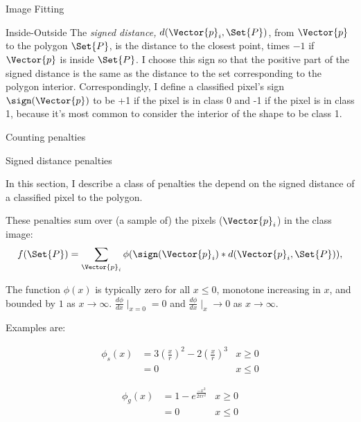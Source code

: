 \begin{plSection}{Image Fitting}
\begin{plSection}{Inside-Outside}
The {\em signed distance,} $d(\Vector{p}_i,\Set{P})$, from $\Vector{p}$ to the polygon $\Set{P}$,
is the distance to the closest point, times $-1$ if $\Vector{p}$ is inside $\Set{P}$.
I choose this sign so that the positive part of the signed distance
is the same as the distance to the set corresponding to the polygon interior.
Correspondingly, I define a classified pixel's sign $\sign(\Vector{p})$ to be +1
if the pixel is in class 0 and -1 if the pixel is in class 1,
because it's most common to consider the interior of the shape
to be class 1.

\end{plSection}%
\begin{plSection}{Counting penalties}
\label{sec:counting-penalties}

\end{plSection}%
\begin{plSection}{Signed distance penalties}
\label{sec:signed-distance-penalties}

In this section, I describe a class of penalties the depend on the
signed distance of a classified pixel to the polygon.

These penalties sum over (a sample of) the pixels ($\Vector{p}_i$) in the class image:
\begin{equation}
f(\Set{P}) = \sum_{\Vector{p}_i} \phi( \sign(\Vector{p}_i) \ast d(\Vector{p}_i,\Set{P}) ) ,
\end{equation}

The function $\phi(x)$ is typically zero for all $x \le 0$,
monotone increasing in $x$, and bounded by $1$ as $x\rightarrow\infty$.
$\frac{d\phi}{dx}\mid_{x=0} = 0$ and $\frac{d\phi}{dx}\mid_{x} \rightarrow 0$
as $x\rightarrow\infty$.

Examples are:

\begin{eqnarray}
\phi_s(x) & = 3 \left(\frac{x}{r}\right)^2 - 2 \left(\frac{x}{r}\right)^3 & {x \geq 0} \\
          & = 0 & {x \leq 0}
\end{eqnarray}

\begin{eqnarray}
\phi_g(x) & = 1 - e^{ \frac{-x^2}{2\pi r^2} } & x \geq 0 \\
          & = 0                               & x \leq 0 \nonumber
\end{eqnarray}

\end{plSection}%
\end{plSection}%
